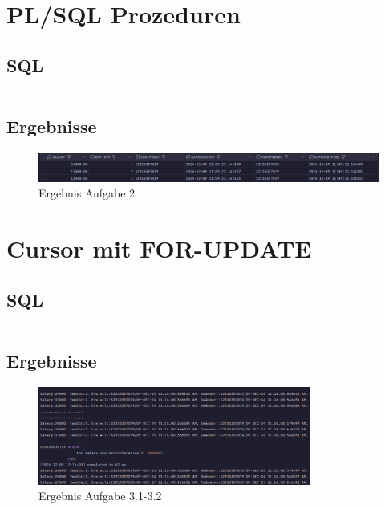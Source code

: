 \documentclass[12pt]{scrartcl}
\begin{document}
\section{PL/SQL Prozeduren}

\subsection{SQL}
\inputminted{sql}{../ue4_2.sql}

\subsection{Ergebnisse}
\begin{figure}[h]
	\centering
	\includegraphics[width=1\textwidth]{../ue4_2.png}
	\caption{Ergebnis Aufgabe 2}
\end{figure}

\section{Cursor mit FOR-UPDATE}

\subsection{SQL}
\inputminted{sql}{../ue4_3.sql}

\subsection{Ergebnisse}
\begin{figure}[h]
	\centering
	\includegraphics[width=0.8\textwidth]{../ue4_3_1.png}
	\caption{Ergebnis Aufgabe 3.1-3.2}
\end{figure}
\end{document}
